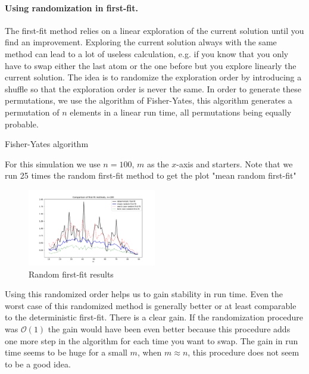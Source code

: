 \documentclass{amsart}
\begin{document}
\paragraph{\textbf{Using randomization in first-fit.}}
The first-fit method relies on a linear exploration of the current solution until you find an improvement. Exploring the current solution always with the same method can lead to a lot of useless calculation, e.g. if you know that you only have to swap either the last atom or the one before but you explore linearly the current solution. The idea is to randomize the exploration order by introducing a shuffle so that the exploration order is never the same. In order to generate these permutations, we use the algorithm of Fisher-Yates, this algorithm generates a permutation of $n$ elements in a linear run time, all permutations being equally probable.
\begin{algorithm}\caption{Fisher-Yates algorithm}\label{fisher yat}
\end{algorithm}
For this simulation we use $n=100$, $m$ as the $x$-axis and  starters. Note that we run 25 times the random first-fit method to get the plot "mean random first-fit"
\begin{figure}[ht]
    \centering
    \includegraphics[width=0.5\textwidth]{plots/random first fit.pdf}
    \caption{Random first-fit results}
    \label{random ff}
\end{figure}
Using this randomized order helps us to gain stability in run time. Even the worst case of this randomized method is generally better or at least comparable to the deterministic first-fit. There is a clear gain. If the randomization procedure was $\mathcal{O}\left(1\right)$ the gain would have been even better because this procedure adds one more step in the algorithm for each time you want to swap. The gain in run time seems to be huge for a small $m$, when $m\approx n$, this procedure does not seem to be a good idea.
\end{document}
